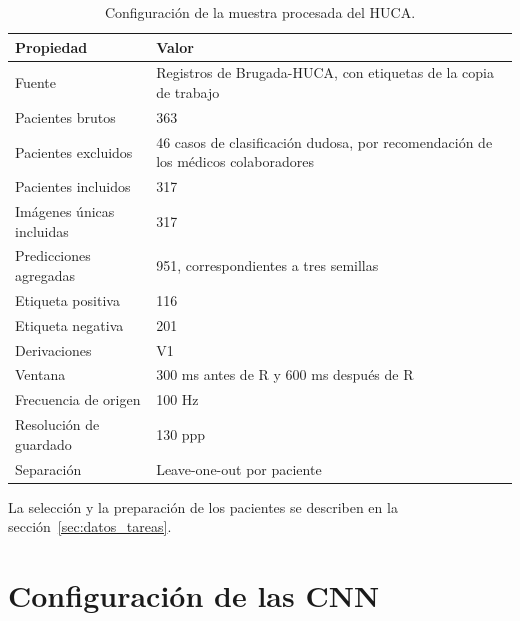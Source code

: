 \begin{table}[H]
  \centering
  \small
  \begin{tabularx}{0.94\textwidth}{p{4.4cm}X}
    \toprule
    Propiedad & Valor \\
    \midrule
    Fuente & Registros de Brugada-HUCA, con etiquetas de la copia de trabajo \\
    Pacientes brutos & 363 \\
    Pacientes excluidos & 46 casos de clasificación dudosa, por recomendación de los médicos colaboradores \\
    Pacientes incluidos & 317 \\
    Imágenes únicas incluidas & 317 \\
    Predicciones agregadas & 951, correspondientes a tres semillas \\
    Etiqueta positiva & 116 \\
    Etiqueta negativa & 201 \\
    Derivaciones & V1 \\
    Ventana & 300 ms antes de R y 600 ms después de R \\
    Frecuencia de origen & 100 Hz \\
    Resolución de guardado & 130 ppp \\
    Separación & Leave-one-out por paciente \\
    \bottomrule
  \end{tabularx}
  \caption{Configuración de la muestra procesada del HUCA.}
  \label{tab:config_huca_final}
\end{table}

La selección y la preparación de los pacientes se describen en la sección~\ref{sec:datos_tareas}.

\clearpage
\section{Configuración de las CNN}

